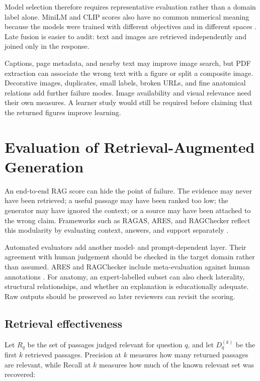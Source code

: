 Model selection therefore requires representative evaluation rather than a domain label alone. MiniLM and CLIP scores also have no common numerical meaning because the models were trained with different objectives and in different spaces \parencite{reimers2019,radford2021}. Late fusion is easier to audit: text and images are retrieved independently and joined only in the response.

Captions, page metadata, and nearby text may improve image search, but PDF extraction can associate the wrong text with a figure or split a composite image. Decorative images, duplicates, small labels, broken URLs, and fine anatomical relations add further failure modes. Image availability and visual relevance need their own measures. A learner study would still be required before claiming that the returned figures improve learning.

\section{Evaluation of Retrieval-Augmented Generation}
\label{sec:rag-evaluation-background}

An end-to-end RAG score can hide the point of failure. The evidence may never have been retrieved; a useful passage may have been ranked too low; the generator may have ignored the context; or a source may have been attached to the wrong claim. Frameworks such as RAGAS, ARES, and RAGChecker reflect this modularity by evaluating context, answers, and support separately \parencite{es2024ragas,saadfalcon2024ares,ru2024ragchecker}.

Automated evaluators add another model- and prompt-dependent layer. Their agreement with human judgement should be checked in the target domain rather than assumed. ARES and RAGChecker include meta-evaluation against human annotations \parencite{saadfalcon2024ares,ru2024ragchecker}. For anatomy, an expert-labelled subset can also check laterality, structural relationships, and whether an explanation is educationally adequate. Raw outputs should be preserved so later reviewers can revisit the scoring.

\subsection{Retrieval effectiveness}

Let $R_q$ be the set of passages judged relevant for question $q$, and let $D_q^{(k)}$ be the first $k$ retrieved passages. Precision at $k$ measures how many returned passages are relevant, while Recall at $k$ measures how much of the known relevant set was recovered:

